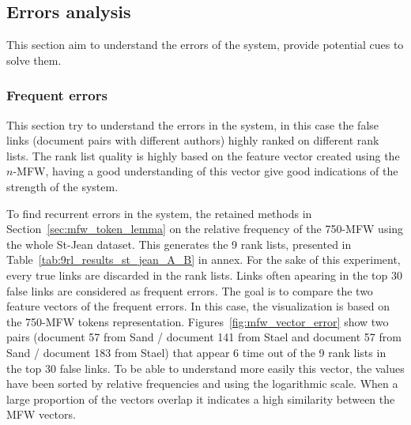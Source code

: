 \subsection{Errors analysis}

This section aim to understand the errors of the system, provide potential cues to solve them.

\subsubsection{Frequent errors}
\label{sec:frequent_errors}

This section try to understand the errors in the system, in this case the false links (document pairs with different authors) highly ranked on different rank lists.
The rank list quality is highly based on the feature vector created using the $n$-MFW, having a good understanding of this vector give good indications of the strength of the system.

To find recurrent errors in the system, the retained methods in Section~\ref{sec:mfw_token_lemma} on the relative frequency of the 750-MFW using the whole St-Jean dataset.
This generates the 9 rank lists, presented in Table~\ref{tab:9rl_results_st_jean_A_B} in annex.
For the sake of this experiment, every true links are discarded in the rank lists.
Links often apearing in the top 30 false links are considered as frequent errors.
The goal is to compare the two feature vectors of the frequent errors.
In this case, the visualization is based on the 750-MFW tokens representation.
Figures~\ref{fig:mfw_vector_error} show two pairs (document 57 from Sand / document 141 from Stael and document 57 from Sand / document 183 from Stael) that appear 6 time out of the 9 rank lists in the top 30 false links.
To be able to understand more easily this vector, the values have been sorted by relative frequencies and using the logarithmic scale.
When a large proportion of the vectors overlap it indicates a high similarity between the MFW vectors.

